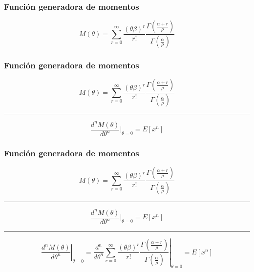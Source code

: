 \begin{frame}
    \frametitle{Función generadora de momentos}
    \begin{equation*}
        M(\theta) = \sum_{r=0}^{\infty} \frac{(\theta \beta)^r}{r!}
        \frac{\Gamma \left (\frac{\alpha+r}{\rho} \right)}{\Gamma \left ( \frac{\alpha}{\rho} \right)}%
    \end{equation*}
    \cite{theory1}
\end{frame}

\begin{frame}
    \frametitle{Función generadora de momentos}
    \begin{equation*}
        M(\theta) = \sum_{r=0}^{\infty} \frac{(\theta \beta)^r}{r!}
        \frac{\Gamma \left (\frac{\alpha+r}{\rho} \right)}{\Gamma \left ( \frac{\alpha}{\rho} \right)}%
    \end{equation*}

    \hrule

    \vspace{0.5cm}
    \begin{equation*}
        \frac{d^n M(\theta)}{d \theta^n} \Big|_{\theta=0} = E[x^n]
    \end{equation*}
    \vspace{0.5cm}
\end{frame}

\begin{frame}
    \frametitle{Función generadora de momentos}
    \begin{equation*}
        M(\theta) = \sum_{r=0}^{\infty} \frac{(\theta \beta)^r}{r!}
        \frac{\Gamma \left (\frac{\alpha+r}{\rho} \right)}{\Gamma \left ( \frac{\alpha}{\rho} \right)}%
    \end{equation*}

    \hrule

    \vspace{0.5cm}
    \begin{equation*}
        \frac{d^n M(\theta)}{d \theta^n} \Big|_{\theta=0} = E[x^n]
    \end{equation*}
    \vspace{0.5cm}

    \hrule

    \vspace{0.5cm}
    \begin{equation*}
        \left.\frac{d^n M(\theta)}{d\theta^n}\right\vert_{\theta = 0}
        = \frac{d^n}{d\theta^n} \sum_{r=0}^{\infty} \frac{(\theta \beta)^r}{r!}
        \left.\frac{\Gamma \left (\frac{\alpha+r}{\rho} \right)}{\Gamma \left ( \frac{\alpha}{\rho} \right)}\right\vert_{\theta = 0} = E[x^n]
    \end{equation*}
    \vspace{0.5cm}
\end{frame}

